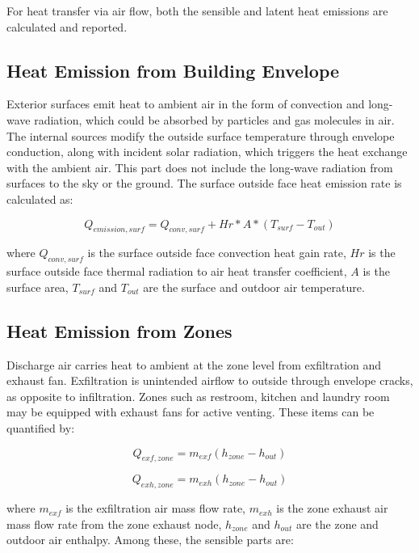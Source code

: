 For heat transfer via air flow, both the sensible and latent heat emissions are calculated and reported.

\subsection{Heat Emission from Building Envelope}\label{emission-from-envelope}

Exterior surfaces emit heat to ambient air in the form of convection and long-wave radiation, which could be absorbed by particles and gas molecules in air. The internal sources modify the outside surface temperature through envelope conduction, along with incident solar radiation, which triggers the heat exchange with the ambient air. This part does not include the long-wave radiation from surfaces to the sky or the ground. The surface outside face heat emission rate is calculated as:

\begin{equation}  \label{eq:he-1}
Q_{emission, surf} = Q_{conv, surf} +  Hr * A * (T_{surf} - T_{out})
\end{equation}

where \(Q_{conv, surf}\) is the surface outside face convection heat gain rate, \(Hr\) is the surface outside face thermal radiation to air heat transfer coefficient, \(A\) is the surface area, \(T_{surf}\) and \(T_{out}\) are the surface and outdoor air temperature.

\subsection{Heat Emission from Zones}\label{emission-from-zones}

Discharge air carries heat to ambient at the zone level from exfiltration and exhaust fan. Exfiltration is unintended airflow to outside through envelope cracks, as opposite to infiltration. Zones such as restroom, kitchen and laundry room may be equipped with exhaust fans for active venting. These items can be quantified by:

\begin{equation}  \label{eq:he-2}
Q_{exf, zone} = m_{exf}(h_{zone} - h_{out})
\end{equation}

\begin{equation}  \label{eq:he-3}
Q_{exh, zone} = m_{exh}(h_{zone} - h_{out})
\end{equation}

where \(m_{exf}\) is the exfiltration air mass flow rate, \(m_{exh}\) is the zone exhaust air mass flow rate from the zone exhaust node, \(h_{zone}\) and \(h_{out}\) are the zone and outdoor air enthalpy. Among these, the sensible parts are:

